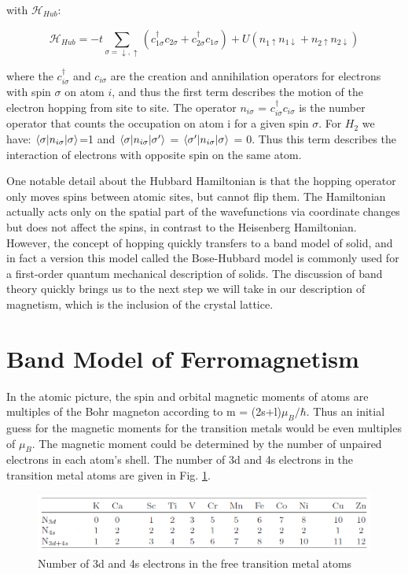 with $\mathscr{H}_{Hub}$:

\begin{equation}
\mathscr{H}_{Hub}=-t\sum_{\sigma=\downarrow,\uparrow}(c^{\dagger}_{1\sigma}c_{2\sigma}+c^{\dagger}_{2\sigma}c_{1\sigma}) + U(n_{1\uparrow}n_{1\downarrow}+n_{2\uparrow}n_{2\downarrow})
\end{equation}

where the $c^{\dagger}_{i\sigma}$ and $c_{i\sigma}$ are the creation and annihilation operators for electrons with spin $\sigma$ on atom $i$, and thus the first term describes the motion of the electron hopping from site to site. The operator $n_{i\sigma}$ = $c^{\dagger}_{i\sigma}c_{i\sigma}$ is the number operator that counts the occupation on atom i for a given spin $\sigma$. For $H_2$ we have: $\braket{\sigma|n_{i\sigma}|\sigma}$=1 and $\braket{\sigma|n_{i\sigma}|\sigma'}$ = $\braket{\sigma'|n_{i\sigma}|\sigma}$ = 0. Thus this term describes the interaction of electrons with opposite spin on the same atom.

One notable detail about the Hubbard Hamiltonian is that the hopping operator only moves spins between atomic sites, but cannot flip them. The Hamiltonian actually acts only on the spatial part of the wavefunctions via coordinate changes but does not affect the spins, in contrast to the Heisenberg Hamiltonian. However, the concept of hopping quickly transfers to a band model of solid, and in fact a version this model called the Bose-Hubbard model is commonly used for a first-order quantum mechanical description of solids. The discussion of band theory quickly brings us to the next step we will take in our description of magnetism, which is the inclusion of the crystal lattice.


\section{Band Model of Ferromagnetism}

In the atomic picture, the spin and orbital magnetic moments of atoms are multiples of the Bohr magneton according to m = (2s+l)$\mu_B/\hbar$. Thus an initial guess for the magnetic moments for the transition metals would be even multiples of $\mu_B$. The magnetic moment could be determined by the number of unpaired electrons in each atom's shell. The number of 3d and 4s electrons in the transition metal atoms are given in Fig. \ref{TransMetalUnpE}.

\begin{figure}
	\begin{center}
		\includegraphics[width=150mm]{figs/TransitionMetalValenceShells}
	\end{center}
\caption{Number of 3d and 4s electrons in the free transition metal atoms}
\label{TransMetalUnpE}
\end{figure}

